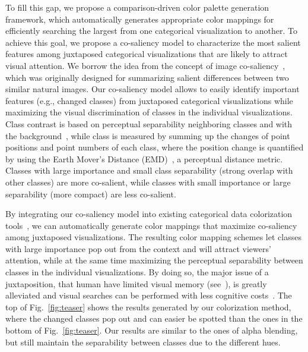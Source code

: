 To fill this gap, we propose a comparison-driven color palette generation framework, which automatically generates appropriate color mappings for efficiently searching the largest  from one categorical visualization to another.
To achieve this goal, we propose a co-saliency model to characterize the most salient features among juxtaposed categorical visualizations that are likely to attract visual attention. We borrow the idea from the concept of image co-saliency~\cite{Jacobs10}, which was originally designed for summarizing salient differences between two similar natural images. 
Our co-saliency model allows to easily identify important features (e.g., changed classes) from juxtaposed categorical visualizations while maximizing the visual discrimination of classes in the individual visualizations.  Class contrast is based on perceptual separability 
neighboring classes and with the background~\cite{Wang2018}, while
class 
is measured by summing up the changes of point positions and point numbers  of each class, where the position change is quantified by using the Earth Mover's Distance (EMD)~\cite{rubner2000earth}, a perceptual distance metric.  
Classes with large importance and small class separability (strong overlap with other classes) are more co-salient, while classes with small importance or large separability (more compact) are less co-salient.

By integrating our co-saliency model into existing categorical data colorization tools~\cite{Lu21}, we can automatically generate color mappings that maximize co-saliency among juxtaposed visualizations. The resulting color mapping schemes let classes with large importance pop out from the context and will attract viewers' attention,  while at the same time maximizing the perceptual separability between classes in the individual visualizations. By doing so,
the major issue of a juxtaposition, that human have limited visual memory (see~\cite{Tominski12}), is greatly alleviated and visual searches can be performed with less cognitive costs~\cite{healey1995visualizing}. 
%
The top of Fig.~\ref{fig:teaser} shows the results generated by our colorization method, where the changed classes pop out and can easier be spotted than the ones in the bottom of Fig.~\ref{fig:teaser}. Our results are similar to the ones of alpha blending, but still maintain the separability between classes due to the different hues.

